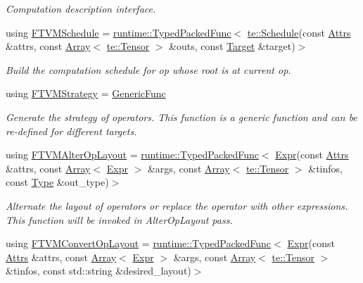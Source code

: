\begin{DoxyCompactItemize}
\begin{DoxyCompactList}\small\item\em Computation description interface. \end{DoxyCompactList}\item 
using \hyperlink{namespacetvm_1_1relay_af8f7c5928c79389da637c35df6c8557c}{F\+T\+V\+M\+Schedule} = \hyperlink{classtvm_1_1runtime_1_1TypedPackedFunc}{runtime\+::\+Typed\+Packed\+Func}$<$ \hyperlink{classtvm_1_1te_1_1Schedule}{te\+::\+Schedule}(const \hyperlink{classtvm_1_1Attrs}{Attrs} \&attrs, const \hyperlink{classtvm_1_1Array}{Array}$<$ \hyperlink{classtvm_1_1te_1_1Tensor}{te\+::\+Tensor} $>$ \&outs, const \hyperlink{classtvm_1_1Target}{Target} \&target)$>$
\begin{DoxyCompactList}\small\item\em Build the computation schedule for op whose root is at current op. \end{DoxyCompactList}\item 
using \hyperlink{namespacetvm_1_1relay_a2eb2ad4e7a83e0a28e2ad073d7bf9305}{F\+T\+V\+M\+Strategy} = \hyperlink{classtvm_1_1GenericFunc}{Generic\+Func}
\begin{DoxyCompactList}\small\item\em Generate the strategy of operators. This function is a generic function and can be re-\/defined for different targets. \end{DoxyCompactList}\item 
using \hyperlink{namespacetvm_1_1relay_ac36536541a0688d02f9172bf8a35813b}{F\+T\+V\+M\+Alter\+Op\+Layout} = \hyperlink{classtvm_1_1runtime_1_1TypedPackedFunc}{runtime\+::\+Typed\+Packed\+Func}$<$ \hyperlink{namespacetvm_1_1relay_a5b84e3790f89bb3fad5c7911eeb99531}{Expr}(const \hyperlink{classtvm_1_1Attrs}{Attrs} \&attrs, const \hyperlink{classtvm_1_1Array}{Array}$<$ \hyperlink{namespacetvm_1_1relay_a5b84e3790f89bb3fad5c7911eeb99531}{Expr} $>$ \&args, const \hyperlink{classtvm_1_1Array}{Array}$<$ \hyperlink{classtvm_1_1te_1_1Tensor}{te\+::\+Tensor} $>$ \&tinfos, const \hyperlink{namespacetvm_1_1relay_a661d95f170bca230773914caeef3fe52}{Type} \&out\+\_\+type)$>$
\begin{DoxyCompactList}\small\item\em Alternate the layout of operators or replace the operator with other expressions. This function will be invoked in Alter\+Op\+Layout pass. \end{DoxyCompactList}\item 
using \hyperlink{namespacetvm_1_1relay_a526f835aaefdc86a8faa7da39802ebd5}{F\+T\+V\+M\+Convert\+Op\+Layout} = \hyperlink{classtvm_1_1runtime_1_1TypedPackedFunc}{runtime\+::\+Typed\+Packed\+Func}$<$ \hyperlink{namespacetvm_1_1relay_a5b84e3790f89bb3fad5c7911eeb99531}{Expr}(const \hyperlink{classtvm_1_1Attrs}{Attrs} \&attrs, const \hyperlink{classtvm_1_1Array}{Array}$<$ \hyperlink{namespacetvm_1_1relay_a5b84e3790f89bb3fad5c7911eeb99531}{Expr} $>$ \&args, const \hyperlink{classtvm_1_1Array}{Array}$<$ \hyperlink{classtvm_1_1te_1_1Tensor}{te\+::\+Tensor} $>$ \&tinfos, const std\+::string \&desired\+\_\+layout)$>$

\end{DoxyCompactItemize}
